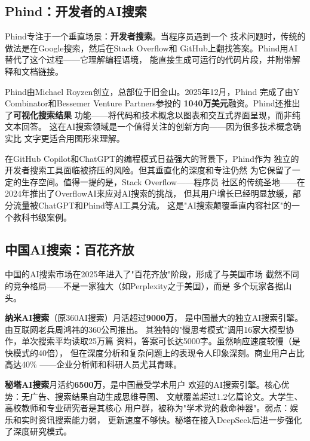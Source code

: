 \subsection{Phind：开发者的AI搜索}
\label{subsec:phind}

Phind专注于一个垂直场景：\textbf{开发者搜索}。当程序员遇到一个
技术问题时，传统的做法是在Google搜索，然后在Stack Overflow和
GitHub上翻找答案。Phind用AI替代了这个过程——它理解编程语境，
能直接生成可运行的代码片段，并附带解释和文档链接。

Phind由Michael Royzen创立，总部位于旧金山。2025年12月，Phind
完成了由Y Combinator和Bessemer Venture Partners参投的
\textbf{1040万美元}融资。Phind还推出了\textbf{可视化搜索结果}
功能——将代码和技术概念以图表和交互式界面呈现，而非纯文本回答。
这在AI搜索领域是一个值得关注的创新方向——因为很多技术概念确实比
文字更适合用图形来理解。

在GitHub Copilot和ChatGPT的编程模式日益强大的背景下，Phind作为
独立的开发者搜索工具面临被挤压的风险。但其垂直化的深度和专注仍然
为它保留了一定的生存空间。值得一提的是，Stack Overflow——程序员
社区的传统圣地——在2024年推出了OverflowAI来应对AI搜索的挑战，
但其用户增长已经明显放缓，部分流量被ChatGPT和Phind等AI工具分流。
这是"AI搜索颠覆垂直内容社区"的一个教科书级案例。

\subsection{中国AI搜索：百花齐放}
\label{subsec:china-search}

中国的AI搜索市场在2025年进入了"百花齐放"阶段，形成了与美国市场
截然不同的竞争格局——不是一家独大（如Perplexity之于美国），而是
多个玩家各据山头。

\textbf{纳米AI搜索}（原360AI搜索）月活超过\textbf{9000万}，
是中国最大的独立AI搜索引擎。由互联网老兵周鸿祎的360公司推出。
其独特的"慢思考模式"调用16家大模型协作，单次搜索平均读取25万篇
资料，答案可长达5000字。虽然响应速度较慢（是快模式的40倍），
但在深度分析和复杂问题上的表现令人印象深刻。商业用户占比高达40\%
——企业分析师和科研人员尤其青睐。

\textbf{秘塔AI搜索}月活约\textbf{6500万}，是中国最受学术用户
欢迎的AI搜索引擎。核心优势：无广告、搜索结果自动生成思维导图、
文献覆盖超过1.2亿篇论文。大学生、高校教师和专业研究者是其核心
用户群，被称为"学术党的救命神器"。弱点：娱乐和实时资讯搜索能力弱，
更新速度不够快。秘塔在接入DeepSeek后进一步强化了深度研究模式。

